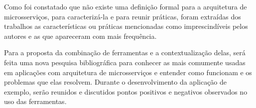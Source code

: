 Como foi constatado que não existe uma definição formal para a arquitetura de microsserviços, para caracterizá-la e para reunir práticas, foram extraídas dos trabalhos as características ou práticas mencionadas como imprescindíveis pelos autores e as que apareceram com mais frequência. 

Para a proposta da combinação de ferramentas e a contextualização delas, será feita uma nova pesquisa bibliográfica para conhecer as mais comumente usadas em aplicações com arquitetura de microsserviços e entender como funcionam e os problemas que elas resolvem. Durante o desenvolvimento da aplicação de exemplo, serão reunidos e discutidos pontos positivos e negativos observados no uso das ferramentas.  


